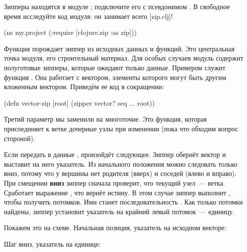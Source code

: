 Зипперы находятся в модуле ; подключите его с псевдонимом
. В свободное время исследуйте код модуля: он занимает всего
[zip.clj]!

\begin{english}
  \begin{clojure}
(ns my.project
  (:require [clojure.zip :as zip]))
  \end{clojure}
\end{english}

Функция  порождает зиппер из исходных данных и функций. Это
центральная точка модуля, его строительный материал. Для особых случаев модуль
содержит полуготовые зипперы, которые ожидают только данные. Примером служит
функция . Она работает с вектором, элементы которого могут быть
другим вложенным вектором. Приведём ее код в сокращении:


\begin{english}
  \begin{clojure/lines}
(defn vector-zip
  [root]
  (zipper vector?
          seq
          ...
          root))
  \end{clojure/lines}
\end{english}

Третий параметр  мы заменили на многоточие. Это функция, которая присоединяет к
ветке дочерные узлы при изменении (пока что обходим вопрос стороной).

Если передать в  данные \code{[1 2 3]}, произойдёт
следующее. Зиппер обернёт вектор и выставит на него указатель. Из начального
положения можно следовать только вниз, потому что у вершины нет родителя (вверх)
и соседей (влево и вправо). При смещении \textbf{вниз} зиппер сначала проверит,
что текущий узел~--- ветка. Сработает выражение , что
вернёт истину. В этом случае зиппер выполнит , чтобы
получить потомков. Ими станет последовательность . Как только
потомки найдены, зиппер установит указатель на крайний левый потомок~---
единицу.

Покажем это на схеме. Начальная позиция, указатель на исходном векторе:

\begin{figure}[H]
  \centering
  
  \label{fig:chart-zip-01}
\end{figure}

Шаг вниз, указатель на единице:

